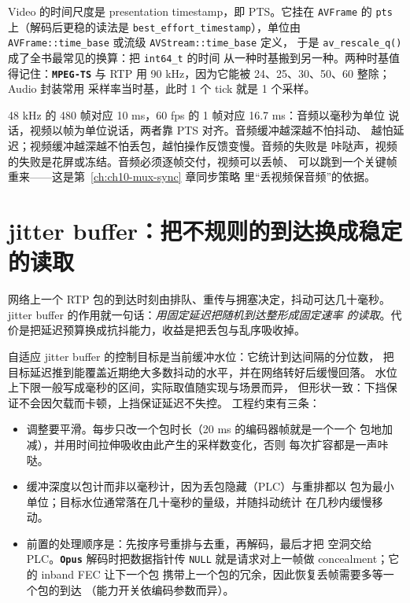 \documentclass[12pt,a4paper,fontset=fandol]{ctexbook}
\newcommand{\Fn}[1]{\texttt{#1()}}
\newcommand{\Tp}[1]{\texttt{#1}}
\newcommand{\Lib}[1]{\textbf{\texttt{#1}}}
\newcommand{\Lang}[1]{\textsf{#1}}
\newcommand{\DomAud}{\Lang{Audio}}
\newcommand{\DomVid}{\Lang{Video}}
\begin{document}
\DomVid{} 的时间尺度是 presentation timestamp，即 PTS。它挂在
\Tp{AVFrame} 的 \Tp{pts} 上（解码后更稳的读法是
\Tp{best\_effort\_timestamp}），单位由 \Tp{AVFrame::time\_base}
或流级 \Tp{AVStream::time\_base} 定义，
于是 \Fn{av\_rescale\_q} 成了全书最常见的换算：把 \Tp{int64\_t} 的时间
从一种时基搬到另一种。两种时基值得记住：\Lib{MPEG-TS}{} 与 RTP 用
90 kHz，因为它能被 24、25、30、50、60 整除；\DomAud{} 封装常用
采样率当时基，此时 1 个 tick 就是 1 个采样。

\begin{compare}[title={\DomAud{} 与 \DomVid{} 的对应概念}]
48 kHz 的 480 帧对应 10 ms，60 fps 的 1 帧对应 16.7 ms：音频以毫秒为单位
说话，视频以帧为单位说话，两者靠 PTS 对齐。音频缓冲越深越不怕抖动、
越怕延迟；视频缓冲越深越不怕丢包，越怕操作反馈变慢。音频的失败是
咔哒声，视频的失败是花屏或冻结。音频必须逐帧交付，视频可以丢帧、
可以跳到一个关键帧重来——这是第~\ref{ch:ch10-mux-sync} 章同步策略
里``丢视频保音频''的依据。
\end{compare}

\section{jitter buffer：把不规则的到达换成稳定的读取}
\label{sec:ch02-jitter}

网络上一个 RTP 包的到达时刻由排队、重传与拥塞决定，抖动可达几十毫秒。
jitter buffer 的作用就一句话：\emph{用固定延迟把随机到达整形成固定速率
的读取}。代价是把延迟预算换成抗抖能力，收益是把丢包与乱序吸收掉。

自适应 jitter buffer 的控制目标是当前缓冲水位：它统计到达间隔的分位数，
把目标延迟推到能覆盖近期绝大多数抖动的水平，并在网络转好后缓慢回落。
水位上下限一般写成毫秒的区间，实际取值随实现与场景而异，
但形状一致：下挡保证不会因欠载而卡顿，上挡保证延迟不失控。
工程约束有三条：

\begin{itemize}
  \item 调整要平滑。每步只改一个包时长（20 ms 的编码器帧就是一个一个
        包地加减），并用时间拉伸吸收由此产生的采样数变化，否则
        每次扩容都是一声咔哒。
  \item 缓冲深度以包计而非以毫秒计，因为丢包隐藏（PLC）与重排都以
        包为最小单位；目标水位通常落在几十毫秒的量级，并随抖动统计
        在几秒内缓慢移动。
  \item 前置的处理顺序是：先按序号重排与去重，再解码，最后才把
        空洞交给 PLC。\Lib{Opus}{} 解码时把数据指针传 \Tp{NULL}
        就是请求对上一帧做 concealment；它的 inband FEC 让下一个包
        携带上一个包的冗余，因此恢复丢帧需要多等一个包的到达
        （能力开关依编码参数而异）。
\end{itemize}
\end{document}
